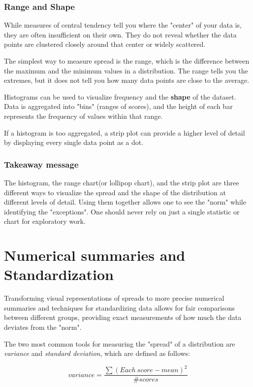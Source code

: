 \subsubsection{Range and Shape}
While measures of central tendency tell you where the "center" of your data is, they are often insufficient on their own. They do not reveal whether the data points are clustered closely around that center or widely scattered.\par
The simplest way to measure spread is the range, which is the difference between the maximum and the minimum values in a distribution. The range tells you the extremes, but it does not tell you how many data points are close to the average.\par
Histograms can be used to visualize frequency and the \textbf{shape} of the dataset. Data is aggregated into "bins" (ranges of scores), and the height of each bar represents the frequency of values within that range.\par
If a histogram is too aggregated, a strip plot can provide a higher level of detail by displaying every single data point as a dot.

\subsubsection{Takeaway message}
The histogram, the range chart(or lollipop chart), and the strip plot are three different ways to visualize the spread and the shape of the distribution at different levels of detail. Using them together allows one to see the "norm" while identifying the "exceptions". One should never rely on just a single statistic or chart for exploratory work. 

\section{Numerical summaries and Standardization}
Transforming visual representations of spreads to more precise numerical summaries and techniques for standardizing data allows for fair comparisons between different groups, providing exact measurements of how much the data deviates from the "norm".\par
The two most common tools for measuring the "spread" of a distribution are \textit{variance} and \textit{standard deviation}, which are defined as follows:\par
\begin{equation}
    variance = \frac{\sum(Each \ score - mean)^2}{\#scores}
\end{equation}


